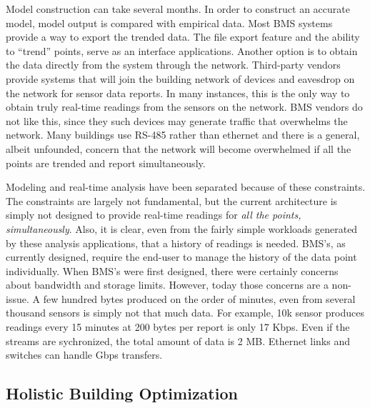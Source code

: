 Model construction can take several months.  In order to construct an accurate model, model output is compared with
empirical data.  Most BMS systems provide a way to export the  trended data.  
The file export feature and the ability to ``trend'' points, serve as an interface applications.
Another option is to obtain the data directly from the system through the network.  Third-party vendors provide systems that 
will join the building network of devices and eavesdrop on the network for sensor data reports.  %
In many instances, this is the only way to obtain truly real-time readings from the sensors on the network.
BMS vendors do not like this, since they such devices may generate traffic that overwhelms the network.  %
Many buildings use RS-485 rather than ethernet and there is
a general, albeit unfounded, concern that the network will become overwhelmed if all the points are trended and report 
simultaneously.

Modeling and real-time analysis have been separated because of these constraints.  The constraints are largely not
fundamental, but the current architecture is simply not designed to provide real-time readings for \emph{all the points, simultaneously}.
Also, it is clear, even from the fairly simple workloads generated by these analysis applications, that a history of readings
is needed.  BMS's, as currently designed, require the end-user to manage the history of the data point individually.
When BMS's were first designed, there were certainly concerns about bandwidth and storage limits.  However, today those concerns
are a non-issue.  A few hundred bytes produced on the order of minutes, even from several thousand sensors is simply not
that much data.  For example, 10k sensor produces readings every 15 minutes at 200 bytes per report is only 
17 Kbps.  Even if the streams are sychronized, the total amount of data is 2 MB.  Ethernet links and switches can handle Gbps 
transfers.


\subsection{Holistic Building Optimization}

